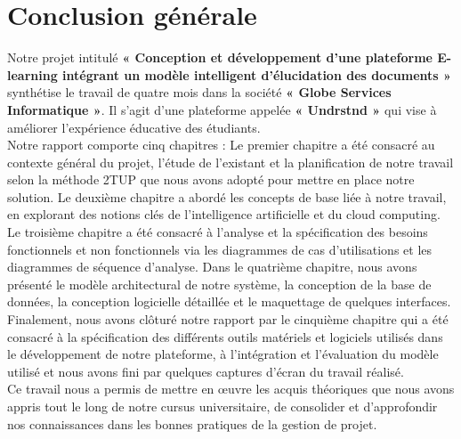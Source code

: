 \thispagestyle{empty}

\chapter*{Conclusion générale}

Notre projet intitulé \textbf{« Conception et développement d’une plateforme E-learning intégrant un modèle intelligent d’élucidation des documents »} synthétise le travail de quatre mois dans la société \textbf{« Globe Services Informatique »}. Il s’agit d’une plateforme appelée \textbf{« Undrstnd »} qui vise à améliorer l’expérience éducative des étudiants.\\

Notre rapport comporte cinq chapitres : Le premier chapitre a été consacré au contexte général du projet, l’étude de l’existant et la planification de notre travail selon la méthode 2TUP que nous avons adopté pour mettre en place notre solution. Le deuxième chapitre a abordé les concepts de base liée à notre travail, en explorant des notions clés de l’intelligence artificielle et du cloud computing. Le troisième chapitre a été consacré à l’analyse et la spécification des besoins fonctionnels et non fonctionnels via les diagrammes de cas d’utilisations et les diagrammes de séquence d’analyse. Dans le quatrième chapitre, nous avons présenté le modèle architectural de notre système, la conception de la base de données, la conception logicielle détaillée et le maquettage de quelques interfaces. Finalement, nous avons clôturé notre rapport par le cinquième chapitre qui a été consacré à la spécification des différents outils matériels et logiciels utilisés dans le développement de notre plateforme, à l’intégration et l’évaluation du modèle utilisé et nous avons fini par quelques captures d’écran du travail réalisé.\\

Ce travail nous a permis de mettre en œuvre les acquis théoriques que nous avons appris tout le long de notre cursus universitaire, de consolider et d’approfondir nos connaissances dans les bonnes pratiques de la gestion de projet.
